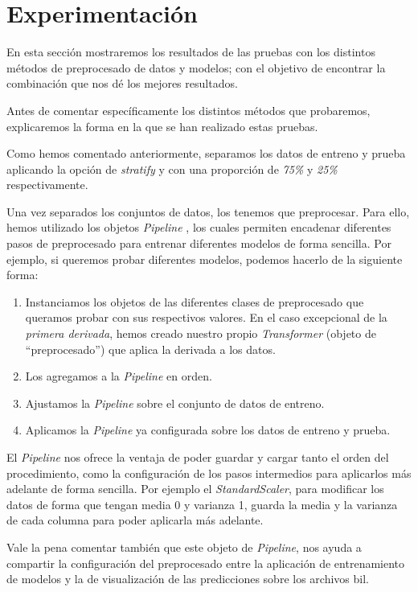 \section{Experimentación}

En esta sección mostraremos los resultados de las pruebas con los distintos métodos de preprocesado de datos y modelos; con el objetivo de encontrar la combinación que nos dé los mejores resultados.

Antes de comentar específicamente los distintos métodos que probaremos, explicaremos la forma en la que se han realizado estas pruebas.

Como hemos comentado anteriormente, separamos los datos de entreno y prueba aplicando la opción de \textit{stratify} y con una proporción de \textit{75\%} y \textit{25\%} respectivamente.

Una vez separados los conjuntos de datos, los tenemos que preprocesar. Para ello, hemos utilizado los objetos \textit{Pipeline} \cite{sklearnp32:online}, los cuales permiten encadenar diferentes pasos de preprocesado para entrenar diferentes modelos de forma sencilla. Por ejemplo, si queremos probar diferentes modelos, podemos hacerlo de la siguiente forma: 

\begin{enumerate}
    \item Instanciamos los objetos de las diferentes clases de preprocesado que queramos probar con sus respectivos valores. En el caso excepcional de la \textit{primera derivada}, hemos creado nuestro propio \textit{Transformer} (objeto de ``preprocesado'') que aplica la derivada a los datos.
    \item Los agregamos a la \textit{Pipeline} en orden.
    \item Ajustamos la \textit{Pipeline} sobre el conjunto de datos de entreno.
    \item Aplicamos la \textit{Pipeline} ya configurada sobre los datos de entreno y prueba. 
\end{enumerate}


El \textit{Pipeline} nos ofrece la ventaja de poder guardar y cargar tanto el orden del procedimiento, como la configuración de los pasos intermedios para aplicarlos más adelante de forma sencilla. Por ejemplo el \textit{StandardScaler}, para modificar los datos de forma que tengan media 0 y varianza 1, guarda la media y la varianza de cada columna para poder aplicarla más adelante.

Vale la pena comentar también que este objeto de \textit{Pipeline}, nos ayuda a compartir la configuración del preprocesado entre la aplicación de entrenamiento de modelos y la de visualización de las predicciones sobre los archivos \gls{bil}.


